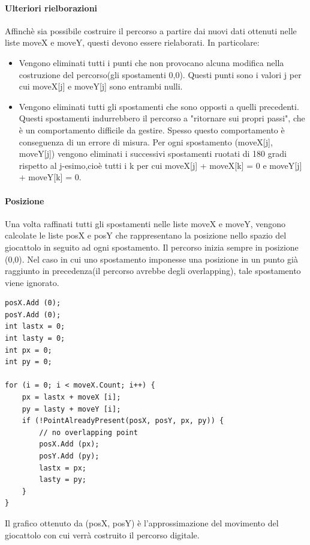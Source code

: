 \documentclass[documentation.tex]{subfiles}
\begin{document}
		\paragraph{Ulteriori rielborazioni} Affinchè sia possibile costruire il percorso a partire dai nuovi dati ottenuti nelle liste moveX e moveY, questi devono essere rielaborati. In particolare:
		\begin{itemize}
			\item Vengono eliminati tutti i punti che non provocano alcuna modifica nella costruzione del percorso(gli spostamenti 0,0). Questi punti sono i valori j per cui moveX[j] e moveY[j] sono entrambi nulli.
			\item Vengono eliminati tutti gli spostamenti che sono opposti a quelli precedenti. Questi spostamenti indurrebbero il percorso a "ritornare sui propri passi", che è un comportamento difficile da gestire. Spesso questo comportamento è conseguenza di un errore di misura. Per ogni spostamento (moveX[j], moveY[j]) vengono eliminati i successivi spostamenti ruotati di 180 gradi rispetto al j-esimo,cioè  tutti i k per cui moveX[j] + moveX[k] = 0 e moveY[j] + moveY[k] = 0.
		\end{itemize}
		\paragraph{Posizione} Una volta raffinati tutti gli spostamenti nelle liste moveX e moveY, vengono calcolate le liste posX e posY che rappresentano la posizione nello spazio del giocattolo in seguito ad ogni spostamento. Il percorso inizia sempre in posizione (0,0). Nel caso in cui uno spostamento imponesse una posizione in un punto già raggiunto in precedenza(il percorso avrebbe degli overlapping), tale spostamento viene ignorato.
		\begin{lstlisting}
posX.Add (0);
posY.Add (0);
int lastx = 0;
int lasty = 0;
int px = 0;
int py = 0;

for (i = 0; i < moveX.Count; i++) {
	px = lastx + moveX [i];
	py = lasty + moveY [i];
	if (!PointAlreadyPresent(posX, posY, px, py)) {
		// no overlapping point
		posX.Add (px);
		posY.Add (py);
		lastx = px;
		lasty = py;
	}
}
		\end{lstlisting}
		Il grafico ottenuto da (posX, posY) è l'approssimazione del movimento del giocattolo con cui verrà costruito il percorso digitale.
		
\end{document}
